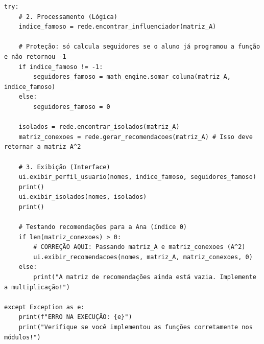 \documentclass[../numerical_methods.tex]{subfiles}
\begin{document}
\begin{verbatim}
try:
    # 2. Processamento (Lógica)
    indice_famoso = rede.encontrar_influenciador(matriz_A)

    # Proteção: só calcula seguidores se o aluno já programou a função e não retornou -1
    if indice_famoso != -1:
        seguidores_famoso = math_engine.somar_coluna(matriz_A, indice_famoso)
    else:
        seguidores_famoso = 0

    isolados = rede.encontrar_isolados(matriz_A)
    matriz_conexoes = rede.gerar_recomendacoes(matriz_A) # Isso deve retornar a matriz A^2

    # 3. Exibição (Interface)
    ui.exibir_perfil_usuario(nomes, indice_famoso, seguidores_famoso)
    print()
    ui.exibir_isolados(nomes, isolados)
    print()

    # Testando recomendações para a Ana (índice 0)
    if len(matriz_conexoes) > 0:
        # CORREÇÃO AQUI: Passando matriz_A e matriz_conexoes (A^2)
        ui.exibir_recomendacoes(nomes, matriz_A, matriz_conexoes, 0)
    else:
        print("A matriz de recomendações ainda está vazia. Implemente a multiplicação!")

except Exception as e:
    print(f"ERRO NA EXECUÇÃO: {e}")
    print("Verifique se você implementou as funções corretamente nos módulos!")
\end{verbatim}
\end{document}
